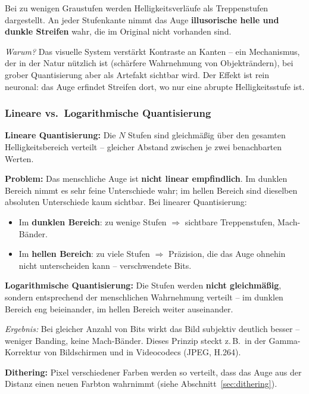 \documentclass[12pt, a4paper]{article}
\begin{document}
Bei zu wenigen Graustufen werden Helligkeitsverläufe als Treppenstufen dargestellt. An jeder Stufenkante nimmt das Auge \textbf{illusorische helle und dunkle Streifen} wahr, die im Original nicht vorhanden sind.

\textit{Warum?} Das visuelle System verstärkt Kontraste an Kanten -- ein Mechanismus, der in der Natur nützlich ist (schärfere Wahrnehmung von Objekträndern), bei grober Quantisierung aber als Artefakt sichtbar wird. Der Effekt ist rein neuronal: das Auge \glqq{}erfindet\grqq{} Streifen dort, wo nur eine abrupte Helligkeitsstufe ist.

\subsubsection*{Lineare vs.\ Logarithmische Quantisierung}

\textbf{Lineare Quantisierung:} Die $N$ Stufen sind gleichmäßig über den gesamten Helligkeitsbereich verteilt -- gleicher Abstand zwischen je zwei benachbarten Werten.

\textbf{Problem:} Das menschliche Auge ist \textbf{nicht linear empfindlich}. Im dunklen Bereich nimmt es sehr feine Unterschiede wahr; im hellen Bereich sind dieselben absoluten Unterschiede kaum sichtbar. Bei linearer Quantisierung:
\begin{itemize}
  \item Im \textbf{dunklen Bereich}: zu wenige Stufen $\Rightarrow$ sichtbare Treppenstufen, Mach-Bänder.
  \item Im \textbf{hellen Bereich}: zu viele Stufen $\Rightarrow$ Präzision, die das Auge ohnehin nicht unterscheiden kann -- verschwendete Bits.
\end{itemize}

\textbf{Logarithmische Quantisierung:} Die Stufen werden \textbf{nicht gleichmäßig}, sondern entsprechend der menschlichen Wahrnehmung verteilt -- im dunklen Bereich eng beieinander, im hellen Bereich weiter auseinander.

\textit{Ergebnis:} Bei gleicher Anzahl von Bits wirkt das Bild subjektiv deutlich besser -- weniger Banding, keine Mach-Bänder. Dieses Prinzip steckt z.\,B.\ in der Gamma-Korrektur von Bildschirmen und in Videocodecs (JPEG, H.264).

\textbf{Dithering:} Pixel verschiedener Farben werden so verteilt,
dass das Auge aus der Distanz einen neuen Farbton wahrnimmt
(siehe Abschnitt~\ref{sec:dithering}).

\end{document}
